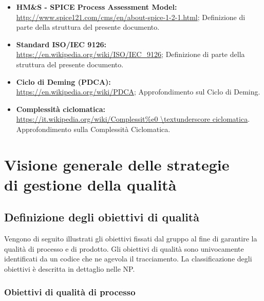 \documentclass[openany,12pt,a4paper]{report}
\begin{document}
\begin{itemize}
        \item \textbf{HM\&S - SPICE Process Assessment Model:} 
        \\ \url{http://www.spice121.com/cms/en/about-spice-1-2-1.html};
	        \subitem Definizione di parte della struttura del presente documento.
        \item \textbf{Standard ISO/IEC 9126:}
        \\ \url{https://en.wikipedia.org/wiki/ISO/IEC_9126};
        	\subitem Definizione di parte della struttura del presente documento.
        \item \textbf{Ciclo di Deming (PDCA):} 
        \\ \url{https://en.wikipedia.org/wiki/PDCA};
        	\subitem Approfondimento sul Ciclo di Deming.
        \item \textbf{Complessità ciclomatica:} 
        \\ \url{https://it.wikipedia.org/wiki/Complessit\%e0 \textunderscore ciclomatica}.
        	\subitem Approfondimento sulla Complessità Ciclomatica.
        
    \end{itemize}


\chapter{Visione generale delle strategie \\ di gestione della qualità}
    
    
    \section{Definizione degli obiettivi di qualità}    
    
    Vengono di seguito illustrati gli obiettivi fissati dal gruppo al fine di garantire la qualità di processo e di prodotto. Gli obiettivi di qualità sono univocamente identificati da un codice che ne agevola il tracciamento. La classificazione degli obiettivi è descritta in dettaglio nelle NP.
    
    \subsection{Obiettivi di qualità di processo}
    
\end{document}
